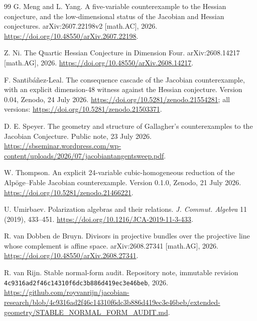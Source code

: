 \documentclass[11pt]{article}
\theoremstyle{remark}
\begin{document}
\begin{thebibliography}{99}
G. Meng and L. Yang.
\newblock A five-variable counterexample to the Hessian conjecture, and the low-dimensional status of the Jacobian and Hessian conjectures.
\newblock arXiv:2607.22198v2 [math.AC], 2026.
\newblock \url{https://doi.org/10.48550/arXiv.2607.22198}.

Z. Ni.
\newblock The Quartic Hessian Conjecture in Dimension Four.
\newblock arXiv:2608.14217 [math.AG], 2026.
\newblock \url{https://doi.org/10.48550/arXiv.2608.14217}.

F. Santib\'a\~nez-Leal.
\newblock The consequence cascade of the Jacobian counterexample, with an explicit dimension-48 witness against the Hessian conjecture.
\newblock Version 0.04, Zenodo, 24 July 2026.
\newblock \url{https://doi.org/10.5281/zenodo.21554281}; all versions: \url{https://doi.org/10.5281/zenodo.21503371}.

D. E. Speyer.
\newblock The geometry and structure of Gallagher's counterexamples to the Jacobian Conjecture.
\newblock Public note, 23 July 2026.
\newblock \url{https://sbseminar.wordpress.com/wp-content/uploads/2026/07/jacobiantangentsweep.pdf}.

W. Thompson.
\newblock An explicit 24-variable cubic-homogeneous reduction of the Alp\"oge--Fable Jacobian counterexample.
\newblock Version 0.1.0, Zenodo, 21 July 2026.
\newblock \url{https://doi.org/10.5281/zenodo.21466221}.

U. Umirbaev.
\newblock Polarization algebras and their relations.
\newblock \emph{J. Commut. Algebra} 11 (2019), 433--451.
\newblock \url{https://doi.org/10.1216/JCA-2019-11-3-433}.

R. van Dobben de Bruyn.
\newblock Divisors in projective bundles over the projective line whose complement is affine space.
\newblock arXiv:2608.27341 [math.AG], 2026.
\newblock \url{https://doi.org/10.48550/arXiv.2608.27341}.

R. van Rijn.
\newblock Stable normal-form audit.
\newblock Repository note, immutable revision \texttt{4c9316ad2f46c14310f6dc3b886d419ec3e46beb}, 2026.
\newblock \url{https://github.com/royvanrijn/jacobian-research/blob/4c9316ad2f46c14310f6dc3b886d419ec3e46beb/extended-geometry/STABLE_NORMAL_FORM_AUDIT.md}.


\end{thebibliography}
\end{document}
